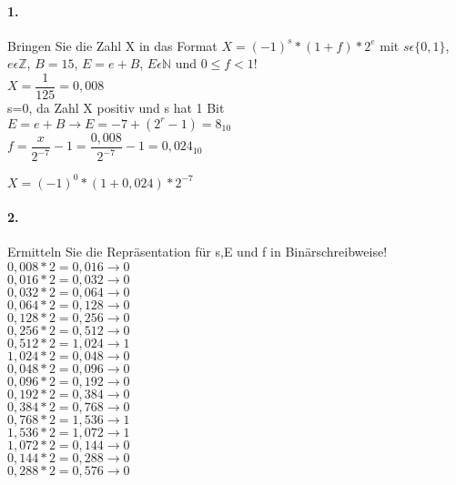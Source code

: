 \documentclass[paper=a4, fontsize=11pt]{scrartcl}
\numberwithin{equation}{section}
\numberwithin{figure}{section}
\numberwithin{table}{section}
\begin{document}
\paragraph{1.}
Bringen Sie die Zahl X in das Format $X=(-1)^{s}*(1+f)*2^{e}$ mit $s \epsilon \{0,1 \}$, $e \epsilon \mathbb{Z}$, $B=15$, $E=e+B$, $E \epsilon \mathbb{N}$ und $0 \leqslant f < 1$! \\

$X=\dfrac{1}{125}=0,008$ \\

s=0, da Zahl X positiv und s hat 1 Bit \\

$E = e+B \rightarrow E=-7+(2^{r}-1) = 8_{10} $ \\

$f=\dfrac{x}{2^{-7}}-1 = \dfrac{0,008}{2^{-7}}-1= 0,024_{10} $

$X=(-1)^{0}*(1+0,024)*2^{-7}$

\paragraph{2.}
Ermitteln Sie die Repräsentation für s,E und f in Binärschreibweise! \\

$0,008*2= 0,016 \rightarrow 0$ \\
$0,016*2= 0,032 \rightarrow 0$ \\

$0,032*2= 0,064 \rightarrow 0$ \\
$0,064*2= 0,128 \rightarrow 0$ \\
$0,128*2= 0,256 \rightarrow 0$ \\
$0,256*2= 0,512 \rightarrow 0$ \\
$0,512*2= 1,024 \rightarrow 1$ \\

$1,024*2= 0,048 \rightarrow 0$ \\
$0,048*2= 0,096 \rightarrow 0$ \\
$0,096*2= 0,192 \rightarrow 0$ \\
$0,192*2= 0,384 \rightarrow 0$ \\
$0,384*2= 0,768 \rightarrow 0$ \\
$0,768*2= 1,536 \rightarrow 1$ \\
$1,536*2= 1,072 \rightarrow 1$ \\
$1,072*2= 0,144 \rightarrow 0$ \\
$0,144*2= 0,288 \rightarrow 0$ \\
$0,288*2= 0,576 \rightarrow 0$ \\
\end{document}
